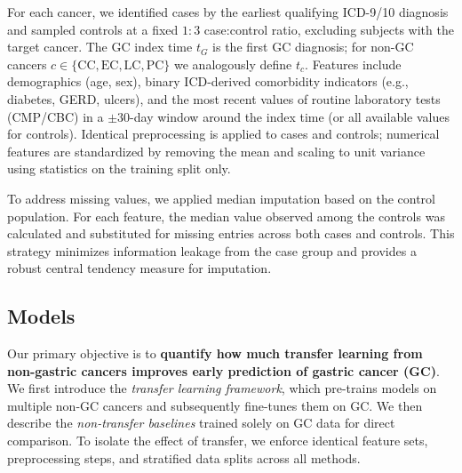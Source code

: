 \documentclass[diagnostics,article,submit,pdftex,moreauthors]{Definitions/mdpi}
\begin{document}
For each cancer, we identified cases by the earliest qualifying ICD-9/10 diagnosis and sampled controls at a fixed $1{:}3$ case:control ratio, excluding subjects with the target cancer.
The GC index time $t_G$ is the first GC diagnosis; for non-GC cancers $c\in\{\mathrm{CC},\mathrm{EC},\mathrm{LC},\mathrm{PC}\}$ we analogously define $t_c$.
Features include demographics (age, sex), binary ICD-derived comorbidity indicators (e.g., diabetes, GERD, ulcers), and the most recent values of routine laboratory tests (CMP/CBC) in a $\pm 30$-day window around the index time (or all available values for controls).
Identical preprocessing is applied to cases and controls; numerical features are standardized by removing the mean and scaling to unit variance using statistics on the training split only.

To address missing values, we applied median imputation based on the control population. 
For each feature, the median value observed among the controls was calculated and substituted for missing entries across both cases and controls. 
This strategy minimizes information leakage from the case group and provides a robust central tendency measure for imputation.





\subsection{Models}
Our primary objective is to \textbf{quantify how much transfer learning from non-gastric cancers improves early prediction of gastric cancer (GC)}. 
We first introduce the \emph{transfer learning framework}, which pre-trains models on multiple non-GC cancers and subsequently fine-tunes them on GC.
We then describe the \emph{non-transfer baselines} trained solely on GC data for direct comparison.
To isolate the effect of transfer, we enforce identical feature sets, preprocessing steps, and stratified data splits across all methods.
\end{document}
